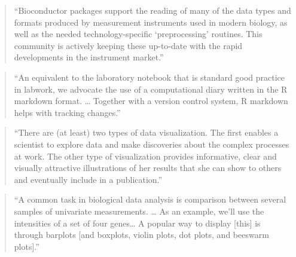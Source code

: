 \documentclass[]{tufte-book}
\begin{document}
\begin{quote}
``Bioconductor packages support the reading of many of the data types and formats
produced by measurement instruments used in modern biology, as well as the
needed technology-specific `preprocessing' routines. This community is
actively keeping these up-to-date with the rapid developments in the
instrument market.'' \citep{holmes2018modern}
\end{quote}

\begin{quote}
``An equivalent to the laboratory notebook that is standard good practice in
labwork, we advocate the use of a computational diary written in the R markdown
format. \ldots{} Together with a version control system, R markdown helps with
tracking changes.'' \citep{holmes2018modern}
\end{quote}

\begin{quote}
``There are (at least) two types of data visualization. The first enables
a scientist to explore data and make discoveries about the complex processes
at work. The other type of visualization provides informative, clear and
visually attractive illustrations of her results that she can show to others
and eventually include in a publication.'' \citep{holmes2018modern}
\end{quote}

\begin{quote}
``A common task in biological data analysis is comparison between several
samples of univariate measurements. \ldots{} As an example, we'll use the intensities
of a set of four genes\ldots{} A popular way to display {[}this{]} is through
barplots {[}and boxplots, violin plots, dot plots, and beeswarm plots{]}.'' \citep{holmes2018modern}
\end{quote}
\end{document}
